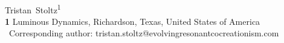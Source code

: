 \documentclass[10pt,letterpaper]{article}
\date{}
\begin{document}
\vspace*{0.2in}

\begin{flushleft}
{\Large\textbf{}}
\newline
\\
Tristan~Stoltz\textsuperscript{1\textasteriskcentered}
\\
\bigskip
\textbf{1} Luminous Dynamics, Richardson, Texas, United States of America
\\
\bigskip
\textasteriskcentered\, Corresponding author: tristan.stoltz@evolvingresonantcocreationism.com

\end{flushleft}

\linenumbers
\end{document}
